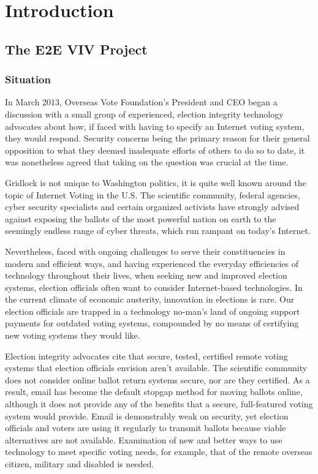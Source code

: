 \chapter{Introduction}
\label{chapter:introduction}

\section{The E2E VIV Project}
\label{sec:e2e-viv-project}

\subsection{Situation}
\label{sec:situation}

In March 2013, Overseas Vote Foundation’s President and CEO began a
discussion with a small group of experienced, election integrity
technology advocates about how, if faced with having to specify an
Internet voting system, they would respond. Security concerns being
the primary reason for their general opposition to what they deemed
inadequate efforts of others to do so to date, it was nonetheless
agreed that taking on the question was crucial at the time. 

Gridlock is not unique to Washington politics, it is quite well known
around the topic of Internet Voting in the U.S. The scientific
community, federal agencies, cyber security specialists and certain
organized activists have strongly advised against exposing the ballots
of the most powerful nation on earth to the seemingly endless range of
cyber threats, which run rampant on today’s Internet. 

Nevertheless, faced with ongoing challenges to serve their
constituencies in modern and efficient ways, and having experienced
the everyday efficiencies of technology throughout their lives, when
seeking new and improved election systems, election officials often
want to consider Internet-based technologies. In the current climate
of economic austerity, innovation in elections is rare. Our election
officials are trapped in a technology no-man’s land of ongoing support
payments for outdated voting systems, compounded by no means of
certifying new voting systems they would like.

Election integrity advocates cite that secure, tested, certified
remote voting systems that election officials envision aren’t
available. The scientific community does not consider online ballot
return systems secure, nor are they certified. As a result, email has
become the default stopgap method for moving ballots online, although
it does not provide any of the benefits that a secure, full-featured
voting system would provide. Email is demonstrably weak on security,
yet election officials and voters are using it regularly to transmit
ballots because viable alternatives are not available. Examination of
new and better ways to use technology to meet specific voting needs,
for example, that of the remote overseas citizen, military and
disabled is needed. 

